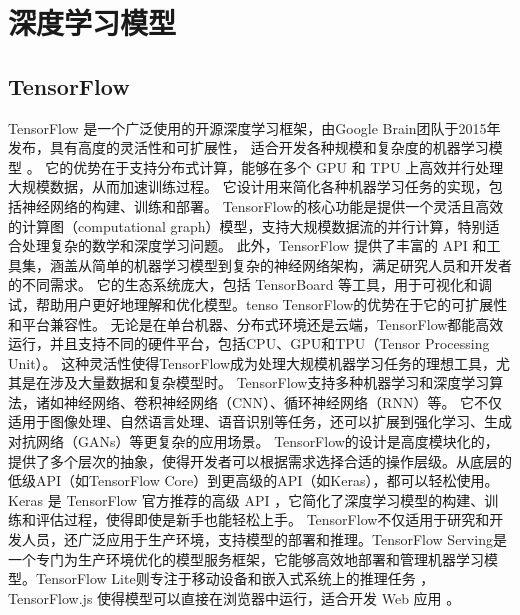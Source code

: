 \documentclass[AutoFakeBold]{LZUThesis-PgD&PhD}
\begin{document}
	\section{深度学习模型}
	
	\subsection{TensorFlow}
	
	TensorFlow 是一个广泛使用的开源深度学习框架，由Google Brain团队于2015年发布，具有高度的灵活性和可扩展性，
	适合开发各种规模和复杂度的机器学习模型 \cite{tensorflow2015-whitepaper}。
	它的优势在于支持分布式计算，能够在多个 GPU 和 TPU 上高效并行处理大规模数据，从而加速训练过程。
	它设计用来简化各种机器学习任务的实现，包括神经网络的构建、训练和部署。
	TensorFlow的核心功能是提供一个灵活且高效的计算图（computational graph）模型，支持大规模数据流的并行计算，特别适合处理复杂的数学和深度学习问题。
	此外，TensorFlow 提供了丰富的 API 和工具集，涵盖从简单的机器学习模型到复杂的神经网络架构，满足研究人员和开发者的不同需求。
	它的生态系统庞大，包括 TensorBoard 等工具，用于可视化和调试，帮助用户更好地理解和优化模型。tenso
	TensorFlow的优势在于它的可扩展性和平台兼容性。
	无论是在单台机器、分布式环境还是云端，TensorFlow都能高效运行，并且支持不同的硬件平台，包括CPU、GPU和TPU（Tensor Processing Unit）。
	这种灵活性使得TensorFlow成为处理大规模机器学习任务的理想工具，尤其是在涉及大量数据和复杂模型时。
	TensorFlow支持多种机器学习和深度学习算法，诸如神经网络、卷积神经网络（CNN）、循环神经网络（RNN）等。
	它不仅适用于图像处理、自然语言处理、语音识别等任务，还可以扩展到强化学习、生成对抗网络（GANs）等更复杂的应用场景。
	TensorFlow的设计是高度模块化的，提供了多个层次的抽象，使得开发者可以根据需求选择合适的操作层级。从底层的低级API（如TensorFlow Core）到更高级的API（如Keras），都可以轻松使用。Keras 是 TensorFlow 官方推荐的高级 API \cite{keras}，它简化了深度学习模型的构建、训练和评估过程，使得即使是新手也能轻松上手。
	TensorFlow不仅适用于研究和开发人员，还广泛应用于生产环境，支持模型的部署和推理。TensorFlow Serving是一个专门为生产环境优化的模型服务框架，它能够高效地部署和管理机器学习模型。TensorFlow Lite则专注于移动设备和嵌入式系统上的推理任务 \cite{tensorflowlite}，TensorFlow.js 使得模型可以直接在浏览器中运行，适合开发 Web 应用 \cite{tensorflowjs}。
	
\end{document}
